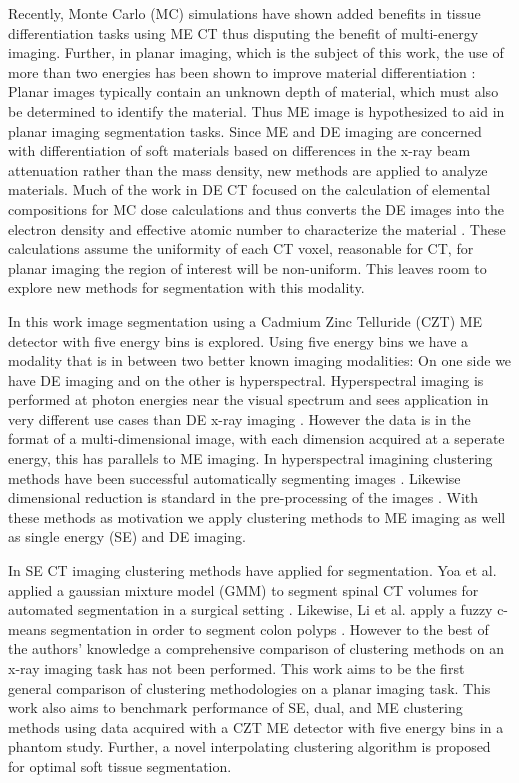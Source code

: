 \documentclass[a4paper,11pt]{article}
\begin{document}
Recently, Monte Carlo (MC) simulations have shown added benefits in tissue differentiation tasks using ME CT \cite{Lalonde2016ACT} thus disputing the benefit of multi-energy imaging. Further, in planar imaging, which is the subject of this work, the use of more than two energies has been shown to improve material differentiation \cite{OConnell2019OptimalDetector}: Planar images typically contain an unknown depth of material, which must also be determined to identify the material. Thus ME image is hypothesized to aid in planar imaging segmentation tasks. Since ME and DE imaging are concerned with differentiation of soft materials based on differences in the x-ray beam attenuation rather than the mass density, new methods are applied to analyze materials. Much of the work in DE CT focused on the calculation of elemental compositions for MC dose calculations and thus converts the DE images into the electron density and effective atomic number to characterize the material \cite{Bazalova2008Dual-energyCalculations,Landry2013DerivingCoefficients,Saito2017ABody}. These calculations assume the uniformity of each CT voxel, reasonable for CT, for planar imaging the region of interest will be non-uniform. This leaves room to explore new methods for segmentation with this modality.

In this work image segmentation using a Cadmium Zinc Telluride (CZT) ME detector with five energy bins is explored. Using five energy bins we have a modality that is in between two better known imaging modalities: On one side we have DE imaging and on the other is hyperspectral. Hyperspectral imaging is performed at photon energies near the visual spectrum and sees application in very different use cases than DE x-ray imaging \cite{Lu2014MedicalReview.,Khan2018ModernReview}. However the data is in the format of a multi-dimensional image, with each dimension acquired at a seperate energy, this has parallels to ME imaging. In hyperspectral imagining clustering methods have been successful automatically segmenting images \cite{Murphy2018UnsupervisedDiffusion,Gillis2012HyperspectralGraphs,Noe2001PartialClustering}. Likewise dimensional reduction is standard in the pre-processing of the images \cite{Mahesh2015HyperspectralMaterials}. With these methods as motivation we apply clustering methods to ME imaging as well as single energy (SE) and DE imaging.

In SE CT imaging clustering methods have applied for segmentation. Yoa et al. applied a gaussian mixture model (GMM) to segment spinal CT volumes for automated segmentation in a surgical setting \cite{Yao2004ColonicModels}. Likewise, Li et al. apply a fuzzy c-means segmentation in order to segment colon polyps \cite{Li2008ImprovedRadiography}. However to the best of the authors' knowledge a comprehensive comparison of clustering methods on an x-ray imaging task has not been performed. This work aims to be the first general comparison of clustering methodologies on a planar imaging task. This work also aims to benchmark performance of SE, dual, and ME clustering methods using data acquired with a CZT ME detector with five energy bins in a phantom study. Further, a novel interpolating clustering algorithm is proposed for optimal soft tissue segmentation.
\end{document}
